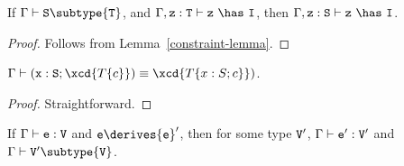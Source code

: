 \begin{lemma}
\label{has-lemma} %
If   $\Gamma \vdash {\tt S} \subtype {\tt T}$,
and  $\Gamma, {\tt z}: {\tt T} \vdash {\tt z}\ \has\ {\tt I}$,
then $\Gamma, {\tt z}: {\tt S} \vdash {\tt z}\ \has\ {\tt I}$.
\end{lemma}

\begin{proof}
Follows from Lemma~\ref{constraint-lemma}.
\end{proof}

\begin{lemma}\label{existslemma}
$\Gamma \vdash ({\tt x}: {\tt S}; \xcd{T\{c\}}) \equiv \xcd{T\{x: S; c\}})$.
\end{lemma}

\begin{proof}
Straightforward.
\end{proof}


\begin{theorem} 
\label{preservation}
If $\Gamma \vdash {\tt e}: {\tt V}$ and ${\tt e} \derives {\tt e}'$, then for some type ${\tt V}'$,
$\Gamma \vdash {\tt e}': {\tt V}'$ and $\Gamma \vdash {\tt V}' \subtype {\tt V}$.
\end{theorem}

